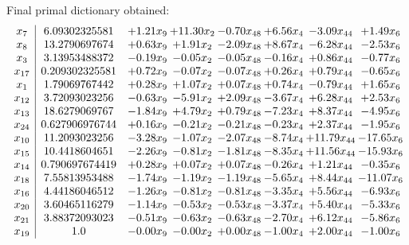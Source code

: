 \documentclass[8pt]{article}
\begin{document}
 Final primal dictionary obtained: 
\[\begin{array}{c| c c@{\hskip 2pt} c@{\hskip 2pt} c@{\hskip 2pt} c@{\hskip 2pt} c@{\hskip 2pt} c@{\hskip 2pt} }
 x_{7}   &  6.09302325581 & +  1.21 x_{9} & + 11.30 x_{2} & -0.70 x_{48} & +  6.56 x_{4} & -3.09 x_{44} & +  1.49 x_{6}\\
 x_{8}   &  13.2790697674 & +  0.63 x_{9} & +  1.91 x_{2} & -2.09 x_{48} & +  8.67 x_{4} & -6.28 x_{44} & -2.53 x_{6}\\
 x_{3}   &  3.13953488372 & -0.19 x_{9} & -0.05 x_{2} & -0.05 x_{48} & -0.16 x_{4} & +  0.86 x_{44} & -0.77 x_{6}\\
 x_{17}   &  0.209302325581 & +  0.72 x_{9} & -0.07 x_{2} & -0.07 x_{48} & +  0.26 x_{4} & +  0.79 x_{44} & -0.65 x_{6}\\
 x_{1}   &  1.79069767442 & +  0.28 x_{9} & +  1.07 x_{2} & +  0.07 x_{48} & +  0.74 x_{4} & -0.79 x_{44} & +  1.65 x_{6}\\
 x_{12}   &  3.72093023256 & -0.63 x_{9} & -5.91 x_{2} & +  2.09 x_{48} & -3.67 x_{4} & +  6.28 x_{44} & +  2.53 x_{6}\\
 x_{13}   &  18.6279069767 & -1.84 x_{9} & +  4.79 x_{2} & +  0.79 x_{48} & -7.23 x_{4} & +  8.37 x_{44} & -4.95 x_{6}\\
 x_{24}   &  0.627906976744 & +  0.16 x_{9} & -0.21 x_{2} & -0.21 x_{48} & -0.23 x_{4} & +  2.37 x_{44} & -1.95 x_{6}\\
 x_{10}   &  11.2093023256 & -3.28 x_{9} & -1.07 x_{2} & -2.07 x_{48} & -8.74 x_{4} & + 11.79 x_{44} & -17.65 x_{6}\\
 x_{15}   &  10.4418604651 & -2.26 x_{9} & -0.81 x_{2} & -1.81 x_{48} & -8.35 x_{4} & + 11.56 x_{44} & -15.93 x_{6}\\
 x_{14}   &  0.790697674419 & +  0.28 x_{9} & +  0.07 x_{2} & +  0.07 x_{48} & -0.26 x_{4} & +  1.21 x_{44} & -0.35 x_{6}\\
 x_{18}   &  7.55813953488 & -1.74 x_{9} & -1.19 x_{2} & -1.19 x_{48} & -5.65 x_{4} & +  8.44 x_{44} & -11.07 x_{6}\\
 x_{16}   &  4.44186046512 & -1.26 x_{9} & -0.81 x_{2} & -0.81 x_{48} & -3.35 x_{4} & +  5.56 x_{44} & -6.93 x_{6}\\
 x_{20}   &  3.60465116279 & -1.14 x_{9} & -0.53 x_{2} & -0.53 x_{48} & -3.37 x_{4} & +  5.40 x_{44} & -5.33 x_{6}\\
 x_{21}   &  3.88372093023 & -0.51 x_{9} & -0.63 x_{2} & -0.63 x_{48} & -2.70 x_{4} & +  6.12 x_{44} & -5.86 x_{6}\\
 x_{19}   &  1.0 & -0.00 x_{9} & -0.00 x_{2} & +  0.00 x_{48} & -1.00 x_{4} & +  2.00 x_{44} & -1.00 x_{6}\\

\end{array}\]
\end{document}
